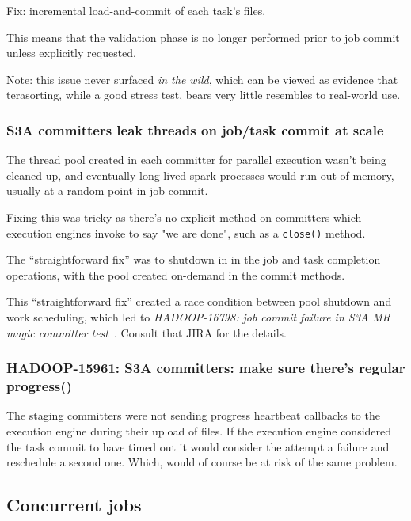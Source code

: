 \documentclass[conference]{IEEEtran}
\begin{document}
Fix: incremental load-and-commit of each task's files.

This means that the validation phase is no longer performed
prior to job commit unless explicitly requested.

Note: this issue never surfaced \emph{in the wild}, which can be
viewed as evidence that terasorting, while a good stress test,
bears very little resembles to real-world use.

\subsubsection{S3A committers leak threads on job/task commit at scale}

The thread pool created in each committer for parallel execution wasn't being
cleaned up, and eventually long-lived spark processes would run out of memory,
usually at a random point in job commit.

Fixing this was tricky as there's no explicit method on committers which
execution engines invoke to say "we are done", such as a \texttt{close()} method.

The ``straightforward fix'' was to shutdown in in the job and task completion
operations, with the pool created on-demand in the commit methods.

This ``straightforward fix'' created a race condition between pool shutdown
and work scheduling, which led to \emph{HADOOP-16798: job commit failure in S3A
MR magic committer test}\ \cite{HADOOP-16798}.
Consult that JIRA for the details.



\subsubsection{HADOOP-15961: S3A committers: make sure there's regular progress()}
\label{subsec:HADOOP-15961}



The staging committers were not sending progress heartbeat callbacks
to the execution engine during their upload of files.
If the execution engine considered the task commit to have timed out
it would consider the attempt a failure and reschedule a second one.
Which, would of course be at risk of the same problem.



\subsection{Concurrent jobs}
\label{subsec:concurrent-jobs}
\end{document}
